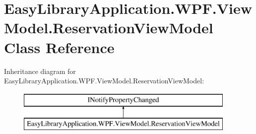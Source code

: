\hypertarget{class_easy_library_application_1_1_w_p_f_1_1_view_model_1_1_reservation_view_model}{}\section{Easy\+Library\+Application.\+W\+P\+F.\+View\+Model.\+Reservation\+View\+Model Class Reference}
\label{class_easy_library_application_1_1_w_p_f_1_1_view_model_1_1_reservation_view_model}
Inheritance diagram for Easy\+Library\+Application.\+W\+P\+F.\+View\+Model.\+Reservation\+View\+Model\+:\begin{figure}[H]
\begin{center}
\leavevmode
\includegraphics[height=2.000000cm]{class_easy_library_application_1_1_w_p_f_1_1_view_model_1_1_reservation_view_model}
\end{center}
\end{figure}

